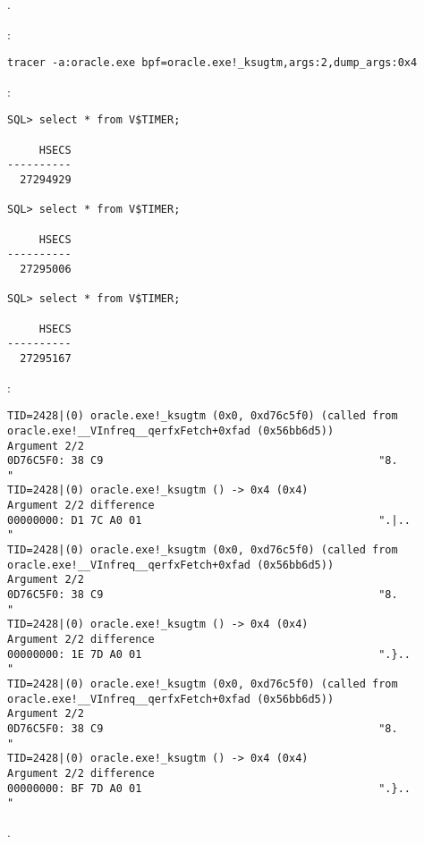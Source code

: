 .

:

\begin{lstlisting}
tracer -a:oracle.exe bpf=oracle.exe!_ksugtm,args:2,dump_args:0x4
\end{lstlisting}

:

\begin{lstlisting}
SQL> select * from V$TIMER;

     HSECS
----------
  27294929

SQL> select * from V$TIMER;

     HSECS
----------
  27295006

SQL> select * from V$TIMER;

     HSECS
----------
  27295167
\end{lstlisting}

:

\begin{lstlisting}
TID=2428|(0) oracle.exe!_ksugtm (0x0, 0xd76c5f0) (called from oracle.exe!__VInfreq__qerfxFetch+0xfad (0x56bb6d5))
Argument 2/2
0D76C5F0: 38 C9                                           "8.              "
TID=2428|(0) oracle.exe!_ksugtm () -> 0x4 (0x4)
Argument 2/2 difference
00000000: D1 7C A0 01                                     ".|..            "
TID=2428|(0) oracle.exe!_ksugtm (0x0, 0xd76c5f0) (called from oracle.exe!__VInfreq__qerfxFetch+0xfad (0x56bb6d5))
Argument 2/2
0D76C5F0: 38 C9                                           "8.              "
TID=2428|(0) oracle.exe!_ksugtm () -> 0x4 (0x4)
Argument 2/2 difference
00000000: 1E 7D A0 01                                     ".}..            "
TID=2428|(0) oracle.exe!_ksugtm (0x0, 0xd76c5f0) (called from oracle.exe!__VInfreq__qerfxFetch+0xfad (0x56bb6d5))
Argument 2/2
0D76C5F0: 38 C9                                           "8.              "
TID=2428|(0) oracle.exe!_ksugtm () -> 0x4 (0x4)
Argument 2/2 difference
00000000: BF 7D A0 01                                     ".}..            "
\end{lstlisting}

.

